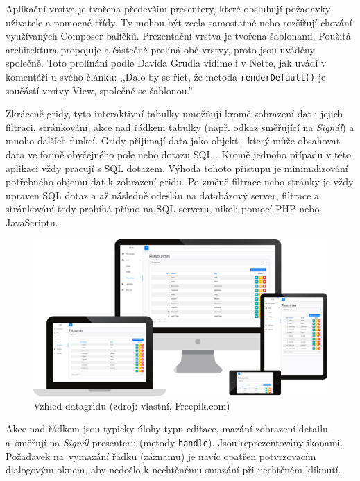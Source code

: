 Aplikační vrstva je tvořena především presentery, které obsluhují požadavky uživatele a pomocné třídy.  Ty mohou být zcela samostatné nebo rozšiřují chování využívaných Composer balíčků. Prezentační vrstva je tvořena šablonami. Použitá architektura propojuje a částečně prolíná obě vrstvy, proto jsou uváděny společně. Toto prolínání podle Davida Grudla vidíme i v Nette, jak uvádí v komentáři u svého článku: ,,Dalo by se říct, že metoda \texttt{renderDefault()} je součástí vrstvy View, společně se šablonou.'' \cite{NetteRefactoring}






\clearpage
{}

 \label{section:Datagridy}
Zkráceně gridy, tyto interaktivní tabulky umožňují kromě zobrazení dat i jejich filtraci, stránkování, akce nad řádkem tabulky (např. odkaz směřující na \textit{Signál}) a mnoho dalších funkcí. Gridy přijímají data jako objekt , který může obsahovat data ve formě obyčejného pole nebo dotazu SQL \cite{ContributteDataGrid}. Kromě jednoho případu v této aplikaci vždy pracují s SQL dotazem. Výhoda tohoto přístupu je minimalizování potřebného objemu dat k zobrazení gridu. Po změně filtrace nebo stránky je vždy upraven SQL dotaz a až následně odeslán na databázový server, filtrace a stránkování tedy probíhá přímo na SQL serveru, nikoli pomocí PHP nebo JavaScriptu.

\begin{figure}[h]
	\centering
	\includegraphics[width=\linewidth]{svg/mockup/datagrid.eps}
	\captionsetup{width=\linewidth}
	\caption[Vzhled datagridu]{Vzhled datagridu (zdroj: vlastní, Freepik.com)}
	\label{mockup:login}
\end{figure}

Akce nad řádkem jsou typicky úlohy typu editace, mazání zobrazení detailu a~směřují na \textit{Signál} presenteru (metody \texttt{handle}). Jsou reprezentovány ikonami. Požadavek na~vymazání řádku (záznamu) je navíc opatřen potvrzovacím dialogovým oknem, aby nedošlo k nechtěnému smazání při nechtěném kliknutí.
